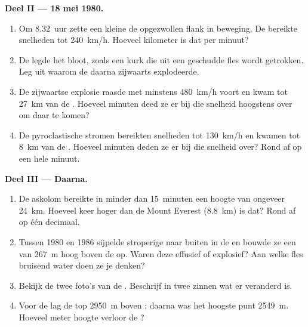 \begin{problem}
\medskip
\noindent\textbf{Deel II --- 18 mei 1980.}\par\nopagebreak
\begin{enumerate}[resume, beginpenalty=10000]
  \item Om 8.32~uur zette een kleine  de opgezwollen flank in
        beweging. De  bereikte snelheden tot
        \qty{240}{km/h}. Hoeveel kilometer is dat per minuut?
  \item De  legde het  bloot, zoals een kurk die uit
        een geschudde fles wordt getrokken. Leg uit waarom de 
        daarna zijwaarts explodeerde.
  \item De zijwaartse explosie raasde met minstens \qty{480}{km/h} voort en
        kwam tot \qty{27}{km} van de . Hoeveel minuten deed ze er bij
        die snelheid hoogstens over om daar te komen?
  \item De pyroclastische stromen bereikten snelheden tot \qty{130}{km/h}
        en kwamen tot \qty{8}{km} van de . Hoeveel minuten deden ze
        er bij die snelheid over? Rond af op een hele minuut.
\end{enumerate}

\medskip
\noindent\textbf{Deel III --- Daarna.}\par\nopagebreak
\begin{enumerate}[resume, beginpenalty=10000]
  \item De askolom bereikte in minder dan 15~minuten een hoogte van
        ongeveer \qty{24}{km}. Hoeveel keer hoger dan de Mount Everest
        (\qty{8.8}{km}) is dat? Rond af op één decimaal.
  \item Tussen 1980 en 1986 sijpelde stroperige  naar buiten in de
         en bouwde ze een  van \qty{267}{m} hoog boven de
         op. Waren deze  effusief of explosief?
        Aan welke fles bruisend water doen ze je denken?
  \item Bekijk de twee foto's van de . Beschrijf in twee zinnen wat
        er veranderd is.
  \item Voor de  lag de top \qty{2950}{m} boven ; daarna
        was het hoogste punt \qty{2549}{m}. Hoeveel meter hoogte verloor de
        ?
\end{enumerate}
\end{problem}
